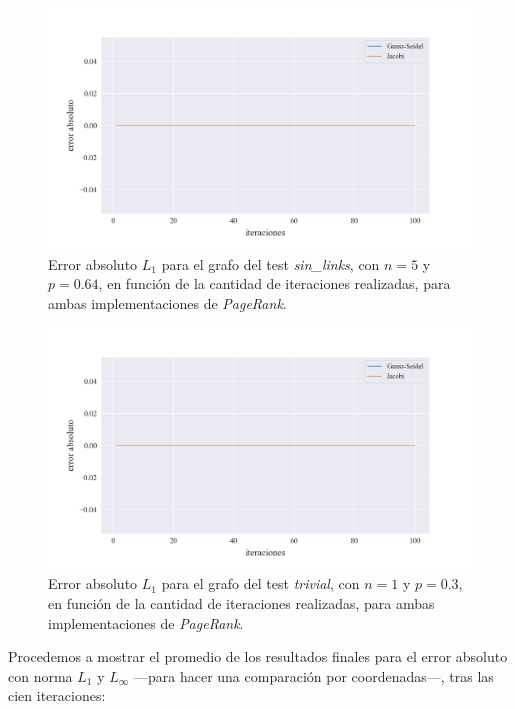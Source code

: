 \vspace{1em}
\begin{figure}[!htbp]
    \centering
    \includegraphics[width=.9\textwidth]{files/src/.media/convergencia_test_sin_links.png}
    \caption{Error absoluto $L_1$ para el grafo del test \textit{sin\_links}, con $n = 5$ y $p = 0.64$, en función de la cantidad de iteraciones realizadas, para ambas implementaciones de \textit{PageRank}.} \label{test_sin_links}
\end{figure}

\vspace{1em}
\begin{figure}[!htbp]
    \centering
    \includegraphics[width=.9\textwidth]{files/src/.media/convergencia_test_trivial.png}
    \caption{Error absoluto $L_1$ para el grafo del test \textit{trivial}, con $n = 1$ y $p = 0.3$, en función de la cantidad de iteraciones realizadas, para ambas implementaciones de \textit{PageRank}.} \label{test_trivial}
\end{figure}

\vspace*{1em}
Procedemos a mostrar el promedio de los resultados finales para el error absoluto con norma $L_1$ y $L_{\infty}$ ---para hacer una comparación por coordenadas---, tras las cien iteraciones:

